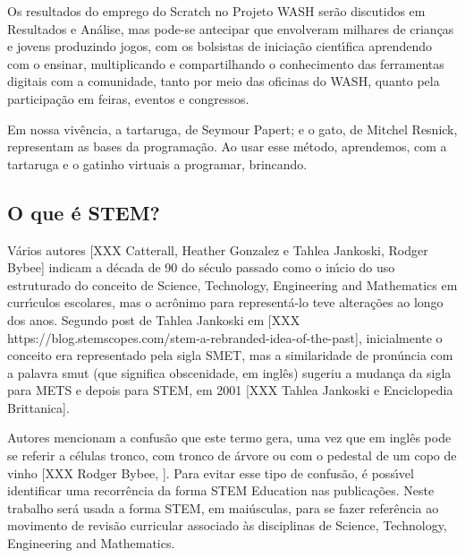 \documentclass[
12pt,		%
openright,	%
twoside,  %
a4paper,			%
chapter=TITLE,		%
english,			%
french,				%
spanish,			%
brazil				%
]{USPSC-classe/USPSC_RedarTex}
\begin{document}
Os resultados do emprego do Scratch no Projeto WASH ser\~ao discutidos em Resultados e An\'alise, mas pode-se antecipar que envolveram milhares de crian\c{c}as e jovens produzindo jogos, com os bolsistas de inicia\c{c}\~ao cient\'{\i}fica aprendendo com o ensinar, multiplicando e compartilhando o conhecimento das ferramentas digitais  com a comunidade, tanto por meio das oficinas do WASH, quanto pela participa\c{c}\~ao em feiras, eventos e congressos.










Em nossa viv\^encia, a tartaruga, de Seymour Papert; e o gato, de Mitchel Resnick,  representam as bases da  programa\c{c}\~ao. Ao usar esse m\'etodo, aprendemos, com a tartaruga e o gatinho virtuais a  programar,  brincando.










\subsection[O que \'e STEM?]{O que \'e STEM?}\label{O que \'e STEM?}
V\'arios autores [XXX Catterall, Heather Gonzalez e  Tahlea Jankoski, Rodger Bybee] indicam a d\'ecada de 90 do s\'eculo passado como o in\'{\i}cio do uso estruturado do conceito de Science, Technology, Engineering and Mathematics em curr\'{\i}culos escolares, mas o acr\^onimo para represent\'a-lo teve altera\c{c}\~oes ao longo dos anos. Segundo post de Tahlea Jankoski em [XXX https://blog.stemscopes.com/stem-a-rebranded-idea-of-the-past], inicialmente o conceito era representado pela sigla SMET, mas a similaridade de pron\'uncia com a palavra \textquotedbl smut (que significa obscenidade, em ingl\^es) sugeriu a mudan\c{c}a da sigla para METS e depois para STEM, em 2001 [XXX Tahlea Jankoski e Enciclopedia Brittanica]. 










Autores mencionam a confus\~ao que este termo gera, uma vez que em ingl\^es pode se referir a c\'elulas tronco, com tronco de \'arvore ou com o pedestal de um copo de vinho [XXX Rodger Bybee, ]. Para evitar esse tipo de confus\~ao, \'e poss\'{\i}vel identificar uma recorr\^encia da forma \textquotedbl STEM Education nas publica\c{c}\~oes. Neste trabalho ser\'a usada a forma STEM, em mai\'usculas, para se fazer refer\^encia ao movimento de revis\~ao curricular associado \`as disciplinas de \textquotedbl Science, Technology, Engineering and Mathematics.  
\end{document}
